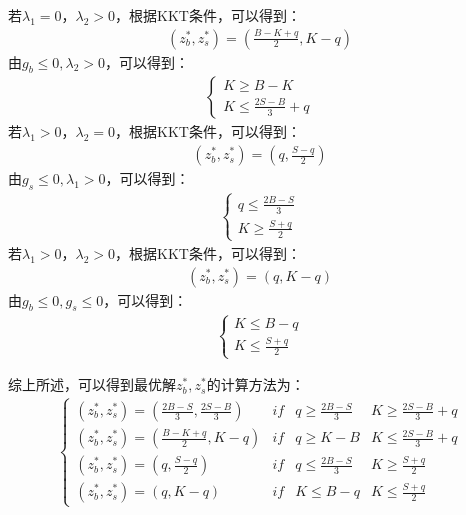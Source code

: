 \documentclass[10pt,a4paper]{article}
\begin{document}
若$\lambda_{1} = 0$，$\lambda_{2} > 0$，根据KKT条件，可以得到：
\begin{align*}
	(z_{b}^{*},z_{s}^{*}) = \left( \frac{B-K+q}{2},K-q \right)
\end{align*}
由$g_{b}\leq 0 ,\lambda_{2}>0$，可以得到：
\begin{align*}
	\left\{
	\begin{matrix}
		K \geq B-K \\
		K \leq \frac{2S-B}{3}+q
	\end{matrix}
	\right.
\end{align*}
若$\lambda_{1} > 0$，$\lambda_{2} = 0$，根据KKT条件，可以得到：
\begin{align*}
	(z_{b}^{*},z_{s}^{*}) = \left( q,\frac{S-q}{2} \right)
\end{align*}
由$g_{s}\leq 0 ,\lambda_{1}>0$，可以得到：
\begin{align*}
	\left\{
	\begin{matrix}
		q \leq \frac{2B-S}{3} \\
		K \geq \frac{S+q}{2}
	\end{matrix}
	\right.
\end{align*}
若$\lambda_{1} > 0$，$\lambda_{2} > 0$，根据KKT条件，可以得到：
\begin{align*}
	(z_{b}^{*},z_{s}^{*}) = \left( q,K-q \right)
\end{align*}
由$g_{b}\leq 0 ,g_{s}\leq 0$，可以得到：
\begin{align*}
	\left\{
	\begin{matrix}
		K \leq B-q \\
		K \leq \frac{S+q}{2}
	\end{matrix}
	\right.
\end{align*}

综上所述，可以得到最优解$z_{b}^{*},z_{s}^{*}$的计算方法为：
\begin{align*}
	\left\{
	\begin{matrix}
		(z_{b}^{*},z_{s}^{*}) = \left( \frac{2B - S}{3},\frac{2S - B}{3} \right) & if & q \geq \frac{2B - S}{3} & K  \geq \frac{2S - B}{3} + q \\
		(z_{b}^{*},z_{s}^{*}) = \left( \frac{B-K+q}{2},K-q \right)               & if & q \geq K-B              & K \leq \frac{2S-B}{3}+q      \\
		(z_{b}^{*},z_{s}^{*}) = \left( q,\frac{S-q}{2} \right)                   & if & q \leq \frac{2B-S}{3}   & K \geq \frac{S+q}{2}         \\
		(z_{b}^{*},z_{s}^{*}) = \left( q,K-q \right)                             & if & K \leq B-q              & K \leq \frac{S+q}{2}
	\end{matrix}
	\right.
\end{align*}
\end{document}
